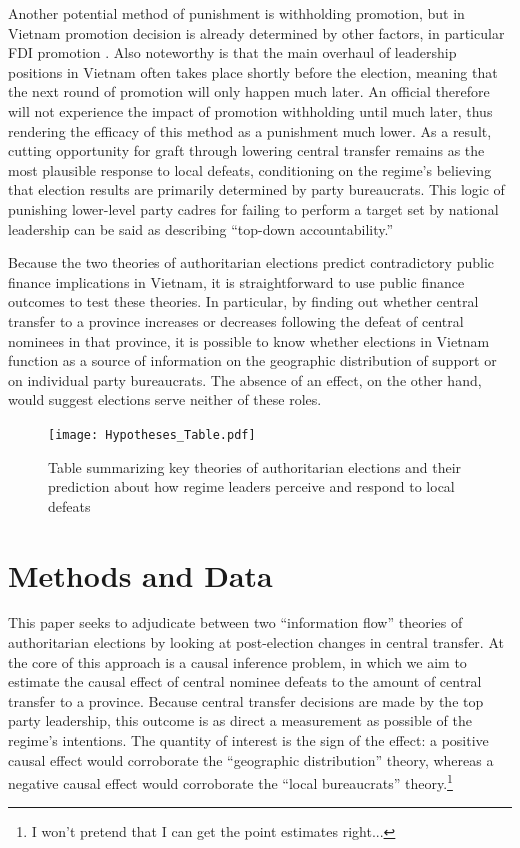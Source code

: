 \documentclass[12pt]{article}\usepackage[]{graphicx}\usepackage[]{color}
\newcommand{\1}{\mathbbm{1}}
\begin{document}
Another potential method of punishment is withholding promotion, but in Vietnam promotion decision is already determined by other factors, in particular FDI promotion \citep{JensenMalesky2015}. Also noteworthy is that the main overhaul of leadership positions in Vietnam often takes place shortly before the election, meaning that the next round of promotion will only happen much later. An official therefore will not experience the impact of promotion withholding until much later, thus rendering the efficacy of this method as a punishment much lower. As a result, cutting opportunity for graft through lowering central transfer remains as the most plausible response to local defeats, conditioning on the regime’s believing that election results are primarily determined by party bureaucrats. This logic of punishing lower-level party cadres for failing to perform a target set by national leadership can be said as describing “top-down accountability.”

Because the two theories of authoritarian elections predict contradictory public finance implications in Vietnam, it is straightforward to use public finance outcomes to test these theories. In particular, by finding out whether central transfer to a province increases or decreases following the defeat of central nominees in that province, it is possible to know whether elections in Vietnam function as a source of information on the geographic distribution of support or on individual party bureaucrats. The absence of an effect, on the other hand, would suggest elections serve neither of these roles.

\begin{landscape}
	\begin{figure}[h]
		\begin{centering}
				\texttt{[image: Hypotheses\_Table.pdf]}
		\end{centering}
		\caption{Table summarizing key theories of authoritarian elections and their prediction about how regime leaders perceive and respond to local defeats}
	\end{figure}
\end{landscape}

\section{Methods and Data}
\label{sec:methods}
This paper seeks to adjudicate between two ``information flow'' theories of authoritarian elections by looking at post-election changes in central transfer. At the core of this approach is a causal inference problem, in which we aim to estimate the causal effect of central nominee defeats to the amount of central transfer to a province. Because central transfer decisions are made by the top party leadership, this outcome is as direct a measurement as possible of the regime's intentions. The quantity of interest is the sign of the effect: a positive causal effect would corroborate the ``geographic distribution'' theory, whereas a negative causal effect would corroborate the ``local bureaucrats'' theory.\footnote{I won't pretend that I can get the point estimates right...}
\end{document}
